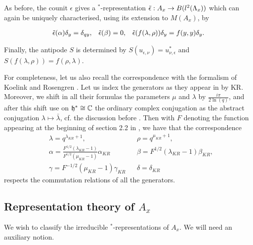 As before, the counit $\epsilon$ gives a $^*$-representation $\operatorname{\tilde{\epsilon}}:A_x \rightarrow B(l^2(\Lambda_x))$ which can again be uniquely characterised, using its extension to $M(A_x)$, by 

\begin{align*} \operatorname{\tilde{\epsilon}}(\alpha) \delta_y = \delta_{qy},&& \operatorname{\tilde{\epsilon}}(\beta) = 0,&&\operatorname{\tilde{\epsilon}}(f(\lambda,\rho))\delta_y = f(y,y)\delta_y.\end{align*}

Finally, the antipode $S$ is determined by $S(u_{\epsilon,\nu}) = u_{\nu,\epsilon}^*$ and $S(f(\lambda,\rho)) = f(\rho,\lambda)$. 

For completeness, let us also recall the correspondence with the formalism of Koelink and Rosengren \cite{KoR1}. Let us index the generators as they appear in \cite[Definition 2.6]{KoR1} by KR. Moreover, we shift in all their formulas the parameters $\mu$ and $\lambda$ by $\frac{i\pi}{2\ln(q)}$, and after this shift use on $\mathfrak{h}^* \cong \mathbb{C}$ the ordinary complex conjugation as the abstract conjugation $\lambda \mapsto \bar{\lambda}$, cf. the discussion before \cite[Definition 2.8]{KoR1}. Then with $F$ denoting the function appearing at the beginning of section 2.2 in \cite{KoR1}, we have that the correspondence \begin{align*} &\lambda = q^{\lambda_{KR}+1},&& \rho = q^{\mu_{KR}+1},\\ &\alpha = \frac{F^{1/2}(\lambda_{KR}-1)}{F^{1/2}(\mu_{KR}-1)}\alpha_{KR}&& \beta = F^{1/2}(\lambda_{KR}-1)\beta_{KR},\\ &\gamma = F^{-1/2}(\mu_{KR}-1)\gamma_{KR}&& \delta = \delta_{KR}\end{align*} respects the commutation relations of all the generators. 

\subsection{Representation theory of $A_x$}


We wish to classify the irreducible $^*$-representations of $A_x$. We will need an auxiliary notion.



